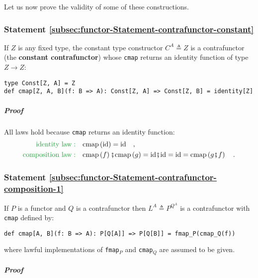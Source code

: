 Let us now prove the validity of some of these constructions.

\subsubsection{Statement \label{subsec:functor-Statement-contrafunctor-constant}\ref{subsec:functor-Statement-contrafunctor-constant}}

If $Z$ is any fixed type, the constant type constructor $C^{A}\triangleq Z$
is a contrafunctor (the \textbf{constant contrafunctor})
whose \lstinline!cmap! returns an identity function of type $Z\rightarrow Z$:
\begin{lstlisting}
type Const[Z, A] = Z
def cmap[Z, A, B](f: B => A): Const[Z, A] => Const[Z, B] = identity[Z] 
\end{lstlisting}


\subparagraph{Proof}

All laws hold because \lstinline!cmap! returns an identity function:
\begin{align*}
{\color{greenunder}\text{identity law}:}\quad & \text{cmap}\left(\text{id}\right)=\text{id}\quad,\\
{\color{greenunder}\text{composition law}:}\quad & \text{cmap}\left(f\right)\bef\text{cmap}\left(g\right)=\text{id}\bef\text{id}=\text{id}=\text{cmap}\left(g\bef f\right)\quad.
\end{align*}


\subsubsection{Statement \label{subsec:functor-Statement-contrafunctor-composition-1}\ref{subsec:functor-Statement-contrafunctor-composition-1}}

If $P$ is a functor and $Q$ is a contrafunctor then $L^{A}\triangleq P^{Q^{A}}$
is a contrafunctor with \lstinline!cmap! defined by:
\begin{lstlisting}
def cmap[A, B](f: B => A): P[Q[A]] => P[Q[B]] = fmap_P(cmap_Q(f))
\end{lstlisting}
where lawful implementations of \lstinline!fmap!$_{P}$ and \lstinline!cmap!$_{Q}$
are assumed to be given.

\subparagraph{Proof}

